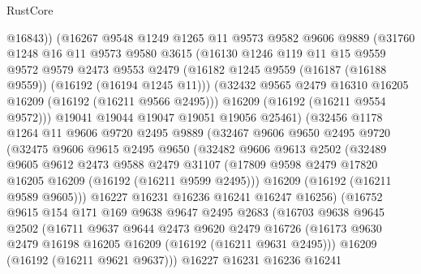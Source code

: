 \begin{lexlean}{RustCore}
\begin{coremodule}
            @16843))
        (@16267
          @9548
          @1249
          @1265
          @11
          @9573
          @9582
          @9606
          @9889
          (@31760
            @1248
            @16
            @11
            @9573
            @9580
            @3615
            (@16130
              @1246
              @119
              @11
              @15
              @9559
              @9572
              @9579
              @2473
              @9553
              @2479
              (@16182 @1245 @9559 (@16187 (@16188 @9559)) (@16192 (@16194 @1245 @11)))
              (@32432 @9565 @2479 @16310 @16205 @16209 (@16192 (@16211 @9566 @2495)))
              @16209
              (@16192 (@16211 @9554 @9572)))
            @19041
            @19044
            @19047
            @19051
            @19056
            @25461)
          (@32456
            @1178
            @1264
            @11
            @9606
            @9720
            @2495
            @9889
            (@32467
              @9606
              @9650
              @2495
              @9720
              (@32475
                @9606
                @9615
                @2495
                @9650
                (@32482
                  @9606
                  @9613
                  @2502
                  (@32489
                    @9605
                    @9612
                    @2473
                    @9588
                    @2479
                    @31107
                    (@17809 @9598 @2479 @17820 @16205 @16209 (@16192 (@16211 @9599 @2495)))
                    @16209
                    (@16192 (@16211 @9589 @9605)))
                  @16227
                  @16231
                  @16236
                  @16241
                  @16247
                  @16256)
                (@16752
                  @9615
                  @154
                  @171
                  @169
                  @9638
                  @9647
                  @2495
                  @2683
                  (@16703
                    @9638
                    @9645
                    @2502
                    (@16711
                      @9637
                      @9644
                      @2473
                      @9620
                      @2479
                      @16726
                      (@16173 @9630 @2479 @16198 @16205 @16209 (@16192 (@16211 @9631 @2495)))
                      @16209
                      (@16192 (@16211 @9621 @9637)))
                    @16227
                    @16231
                    @16236
                    @16241

\end{coremodule}
\end{lexlean}
